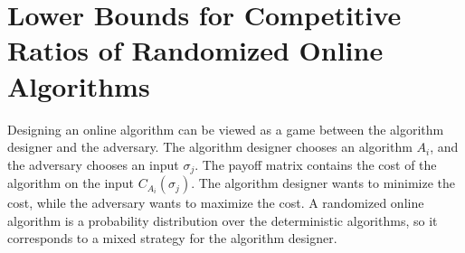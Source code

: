 \documentclass{article}
\begin{document}
%


%
%
%
%

%




\section{Lower Bounds for Competitive Ratios of Randomized Online Algorithms}

Designing an online algorithm can be viewed as a game between the algorithm designer and the adversary.  The algorithm designer chooses an algorithm $A_i$, and the adversary chooses an input $\sigma_j$.  The payoff matrix contains the cost of the algorithm on the input $C_{A_i}(\sigma_j)$.  The algorithm designer wants to minimize the cost, while the adversary wants to maximize the cost.  A randomized online algorithm is a probability distribution over the deterministic algorithms, so it corresponds to a mixed strategy for the algorithm designer.
\end{document}
